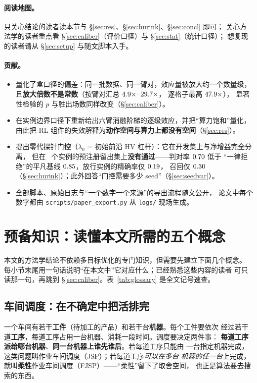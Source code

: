 \documentclass[UTF8, a4paper, 11pt]{ctexart}
\newcommand{\lam}{\lambda_0}
\begin{document}
\paragraph{阅读地图。}
只关心结论的读者读本节与 \S\ref{sec:res}、\S\ref{sec:hurink}、\S\ref{sec:concl} 即可；
关心方法学的读者重点看 \S\ref{sec:caliber}（评价口径）与 \S\ref{sec:stat}（统计口径）；
想复现的读者请从 \S\ref{sec:setup} 与随文脚本入手。

\paragraph{贡献。}
\begin{itemize}\itemsep2pt
  \item 量化了盒口径的偏差：同一批数据、同一臂对，效应量被放大约一个数量级，
        且\textbf{放大倍数不是常数}（按臂对汇总 $4.9\times$--$29.7\times$，
        逐格子最高 $47.9\times$），
        显著性检验的 $p$ 与胜出场数同样改变（\S\ref{sec:caliber}）。
  \item 在实例边界口径下重新给出六臂消融阶梯的逐级效应，并把“算力饱和”量化，
        由此把 RL 组件的失效解释为\textbf{动作空间与算力上都没有空间}（\S\ref{sec:res}）。
  \item 提出零代探针门控（$\lam$ = 初始前沿 HV 杠杆）：它在开发集上与净增益完全分离，
        但在 \HKn\ 个实例的预注册留出集上\textbf{没有通过}——判对率 $0.70$ 低于
        “一律拒绝”的平凡基线 $0.85$，放行实例的精确率仅 $0.19$，
        召回仅 $0.30$（\S\ref{sec:hurink}）；此外回答“门控需要多少 seed”（\S\ref{sec:seedvar}）。
  \item 全部脚本、原始日志与“一个数字一个来源”的导出流程随文公开，
        论文中每个数字都由 \texttt{scripts/paper\_export.py} 从 \texttt{logs/} 现场生成。
\end{itemize}

\section{预备知识：读懂本文所需的五个概念}\label{sec:prelim}
本文的方法学结论不依赖多目标优化的专门知识，但需要先建立下面几个概念。
每小节末尾用一句话说明“在本文中”它对应什么；已经熟悉这些内容的读者
可只读那一句，再跳到 \S\ref{sec:caliber}。表~\ref{tab:glossary} 是全文记号速查。

\subsection{车间调度：在不确定中把活排完}
一个车间有若干\textbf{工件}（待加工的产品）和若干台\textbf{机器}。每个工件要依次
经过若干道\textbf{工序}，每道工序占用一台机器、消耗一段时间。调度要决定两件事：
\textbf{每道工序派给哪台机器}、\textbf{同一台机器上谁先谁后}。若每道工序只能由
一台指定机器完成，这类问题叫作业车间调度（JSP）；若每道工序\emph{可以在多台
机器的任一台}上完成，就叫\textbf{柔性}作业车间调度（FJSP）——“柔性”留下了取舍空间，
也正是算法要去搜索的东西。
\end{document}

